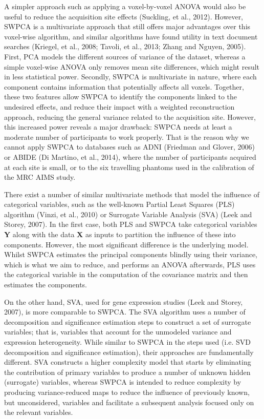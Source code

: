 	A simpler approach such as applying a voxel-by-voxel ANOVA would also be
	useful to reduce the acquisition site effects (Suckling, et al., 2012).
	However, SWPCA is a multivariate approach that still offers major
	advantages over this voxel-wise algorithm, and similar algorithms have
	found utility in text document searches (Kriegel, et al., 2008; Tavoli,
	et al., 2013; Zhang and Nguyen, 2005). First, PCA models the different
	sources of variance of the dataset, whereas a simple voxel-wise ANOVA
	only removes mean site differences, which might result in less
	statistical power. Secondly, SWPCA is multivariate in nature, where
	each component contains information that potentially affects all
	voxels. Together, these two features allow SWPCA to identify the
	components linked to the undesired effects, and reduce their impact
	with a weighted reconstruction approach, reducing the general variance
	related to the acquisition site. However, this increased power reveals
	a major drawback: SWPCA needs at least a moderate number of
	participants to work properly. That is the reason why we cannot apply
	SWPCA to databases such as ADNI (Friedman and Glover, 2006) or ABIDE
	(Di Martino, et al., 2014), where the number of participants acquired
	at each site is small, or to the six travelling phantoms used in the
	calibration of the MRC AIMS study. 


	There exist a number of similar multivariate methods that model the
	influence of categorical variables, such as the well-known Partial
	Least Squares (PLS) algorithm (Vinzi, et al., 2010) or Surrogate
	Variable Analysis (SVA) (Leek and Storey, 2007). In the first case,
	both PLS and SWPCA take categorical variables \textbf{Y} along with the
	data \textbf{X} as inputs to partition the influence of these into
	components. However, the most significant difference is the underlying
	model. Whilst SWPCA estimates the principal components blindly using
	their variance, which is what we aim to reduce, and performs an ANOVA
	afterwards, PLS uses the categorical variable in the computation of the
	covariance matrix and then estimates the components. 


	On the other hand, SVA, used for gene expression studies (Leek and
	Storey, 2007), is more comparable to SWPCA. The SVA algorithm uses a
	number of decomposition and significance estimation steps to construct
	a set of surrogate variables; that is, variables that account for the
	unmodeled variance and expression heterogeneity. While similar to SWPCA
	in the steps used (i.e. SVD decomposition and significance estimation),
	their approaches are fundamentally different. SVA constructs a higher
	complexity model that starts by eliminating the contribution of primary
	variables to produce a number of unknown hidden (surrogate) variables,
	whereas SWPCA is intended to reduce complexity by producing
	variance-reduced maps to reduce the influence of previously known, but
	unconsidered, variables and facilitate a subsequent analysis focused
	only on the relevant variables.


